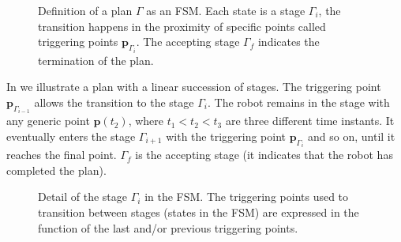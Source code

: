 \begin{figure}[h!]
  \center
  \caption[Definition of a plan]{Definition of a plan $\Gamma$ as an FSM. Each state is a stage $\Gamma_i$, the transition happens in the proximity of specific points called triggering points $\mathbf{p}_{\Gamma_i}$. The accepting stage $\Gamma_f$ indicates the termination of the plan.}
  \label{fig:state-machine}
\end{figure}
In  we illustrate a plan with a linear succession of stages. The triggering point $\mathbf{p}_{\Gamma_{i-1}}$ allows the transition to the stage $\Gamma_i$. The robot remains in the stage with any generic point $\mathbf{p}(t_2)$, where $t_1<t_2<t_3$ are three different time instants. It eventually enters the stage $\Gamma_{i+1}$ with the triggering point $\mathbf{p}_{\Gamma_i}$ and so on, until it reaches the final point. $\Gamma_f$ is the accepting stage (it indicates that the robot has completed the plan).
\begin{figure}[h!]
  \center
\caption[Detail of a stage in the FSM]{Detail of the stage $\Gamma_i$ in the FSM. The triggering points used to transition between stages (states in the FSM) are expressed in the function of the last and/or previous triggering points.}
\label{fig:state-machine2}
\end{figure}
